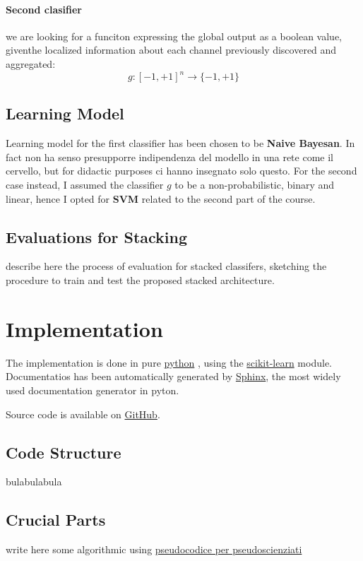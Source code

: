 \documentclass[10pt]{article}
\begin{document}
\paragraph{Second clasifier} we are looking for a funciton expressing the global output as a boolean value, giventhe localized information about each channel previously discovered and aggregated:
$$
g: [-1, +1]^n \to \{-1, +1\}
$$


\subsection{Learning Model}
Learning model for the first classifier has been chosen to be \textbf{Naive Bayesan}. In fact non ha senso presupporre indipendenza del modello in una rete come il cervello, but for didactic purposes ci hanno insegnato solo questo.
 For the second case instead, I assumed the classifier $g$ to be  a non-probabilistic, binary and linear, hence I opted for \textbf{SVM} related to the second part of the course.

\subsection{Evaluations for Stacking}
describe here the process of evaluation for stacked classifers, sketching the procedure to train and test the proposed stacked architecture.


\section{Implementation}
The implementation is done in pure 
\href{https://python.org/}{python}
, using the
\href{http://scikit-learn.org/stable/}{scikit-learn}
module. Documentatios has been automatically generated by
\href{http://sphinx-doc.org/}{Sphinx}, the most widely used documentation generator in pyton.

Source code is available on 
\href{https://github.com/mmaker/braindecoding}{GitHub}.

\subsection{Code Structure}
bulabulabula
\subsection{Crucial Parts}
write here some algorithmic using \href{https://en.wikibooks.org/wiki/LaTeX/Algorithms_and_Pseudocode}{pseudocodice per pseudoscienziati}
\end{document}
